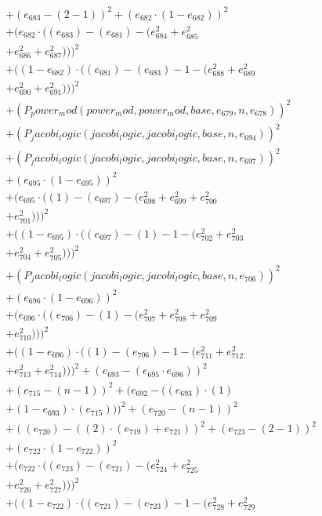 \documentclass[10pt, a4paper]{article}
\begin{document}
\begin{align*}
& + (e_{683} - (2 - 1))^{2} + (e_{682}  \cdot  (1 - e_{682}))^{2} \\
& + (e_{682}  \cdot  ((e_{683}) - (e_{681}) - (e_{684}^{2} + e_{685}^{2} \\
& + e_{686}^{2} + e_{687}^{2})))^{2} \\
& + ((1 - e_{682})  \cdot  ((e_{681}) - (e_{683}) - 1 - (e_{688}^{2} + e_{689}^{2} \\
& + e_{690}^{2} + e_{691}^{2})))^{2} \\
& + (P_power_mod(power_mod, power_mod, base, e_{679}, n, e_{678}))^{2} \\
& + (P_jacobi_logic(jacobi_logic, jacobi_logic, base, n, e_{694}))^{2} \\
& + (P_jacobi_logic(jacobi_logic, jacobi_logic, base, n, e_{697}))^{2} \\
& + (e_{695}  \cdot  (1 - e_{695}))^{2} \\
& + (e_{695}  \cdot  ((1) - (e_{697}) - (e_{698}^{2} + e_{699}^{2} + e_{700}^{2} \\
& + e_{701}^{2})))^{2} \\
& + ((1 - e_{695})  \cdot  ((e_{697}) - (1) - 1 - (e_{702}^{2} + e_{703}^{2} \\
& + e_{704}^{2} + e_{705}^{2})))^{2} \\
& + (P_jacobi_logic(jacobi_logic, jacobi_logic, base, n, e_{706}))^{2} \\
& + (e_{696}  \cdot  (1 - e_{696}))^{2} \\
& + (e_{696}  \cdot  ((e_{706}) - (1) - (e_{707}^{2} + e_{708}^{2} + e_{709}^{2} \\
& + e_{710}^{2})))^{2} \\
& + ((1 - e_{696})  \cdot  ((1) - (e_{706}) - 1 - (e_{711}^{2} + e_{712}^{2} \\
& + e_{713}^{2} + e_{714}^{2})))^{2} + (e_{693} - (e_{695}  \cdot  e_{696}))^{2} \\
& + (e_{715} - (n - 1))^{2} + (e_{692} - ((e_{693})  \cdot  (1) \\
& + (1 - e_{693})  \cdot  (e_{715})))^{2} + (e_{720} - (n - 1))^{2} \\
& + ((e_{720}) - ((2)  \cdot  (e_{719}) + e_{721}))^{2} + (e_{723} - (2 - 1))^{2} \\
& + (e_{722}  \cdot  (1 - e_{722}))^{2} \\
& + (e_{722}  \cdot  ((e_{723}) - (e_{721}) - (e_{724}^{2} + e_{725}^{2} \\
& + e_{726}^{2} + e_{727}^{2})))^{2} \\
& + ((1 - e_{722})  \cdot  ((e_{721}) - (e_{723}) - 1 - (e_{728}^{2} + e_{729}^{2} \\

\end{align*}
\end{document}
